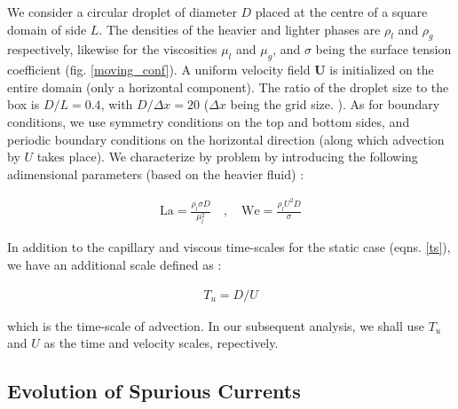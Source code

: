 We consider a circular droplet of diameter $D$ placed at the centre of a square domain of side $L$. The densities of the heavier and lighter phases are $\rho_l$ and $\rho_g$ respectively, likewise for the viscosities $\mu_l$ and $\mu_g$, and $\sigma$ being the surface tension coefficient (fig. \ref{moving_conf}). A uniform velocity field $\boldsymbol{U}$ is initialized on the entire domain (only a horizontal component). The ratio of the droplet size to the box is $D/L = 0.4$, with $D/\Delta x= 20$ ($\Delta x$ being the grid size.  ). As for boundary conditions, we use symmetry conditions on the top and bottom sides, and periodic boundary conditions on the horizontal direction (along which advection by $U$ takes place). We characterize by problem by introducing the following adimensional parameters (based on the heavier fluid) :

\begin{align}
	\textrm{La} = \frac{\rho_l \sigma D}{\mu_l^2} \quad , \quad \textrm{We} = \frac{\rho_l U^2 D}{\sigma}
\end{align}

In addition to the capillary and viscous time-scales for the static case (eqns. \ref{ts}), we have an additional scale defined as :

\begin{align}
	T_{u} = D/U
\end{align}

which is the time-scale of advection. In our subsequent analysis, we shall use $T_u$ and $U$ as the time and velocity scales, repectively.

\subsection*{Evolution of Spurious Currents}


